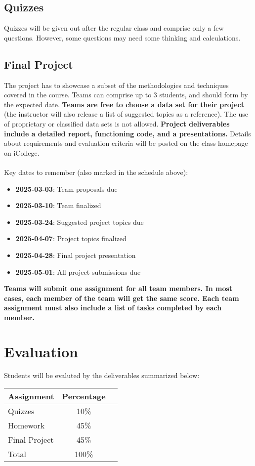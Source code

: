 \documentclass[a4paper, 12pt]{article}
\begin{document}
\subsection{Quizzes}
Quizzes will be given out after the regular class and comprise only a few questions. However, some questions may need some thinking and calculations.

\subsection{Final Project}
The project has to showcase a subset of the methodologies and techniques covered in the course. Teams can comprise up to 3 students, and should form by the expected date. \textbf{Teams are free to choose a data set for their project} (the instructor will also release a list of suggested topics as a reference). The use of proprietary or classiﬁed data sets is not allowed. \textbf{Project deliverables include a detailed report, functioning code, and a presentations.} Details about requirements and evaluation criteria will be posted on the class homepage on iCollege.\\
\\
Key dates to remember (also marked in the schedule above):\\
\begin{itemize}
  \item \textbf{2025-03-03}: Team proposals due
  \item \textbf{2025-03-10}: Team finalized
  \item \textbf{2025-03-24}: Suggested project topics due
  \item \textbf{2025-04-07}: Project topics finalized
  \item \textbf{2025-04-28}: Final project presentation
  \item \textbf{2025-05-01}: All project submissions due
\end{itemize}

\begin{flushleft}
	\textbf{Teams will submit one assignment for all team members. In most cases, each member of the team will get the same score. Each team assignment must also include a list of tasks completed by each member.}
\end{flushleft}

\section{Evaluation}
Students will be evaluted by the deliverables summarized below:\\
\begin{center}
	\begin{tabular}{lcr}
		\hline
		Assignment & Percentage \\
		\hline
		Quizzes & 10\%\\
		Homework & 45\%\\
		Final Project & 45\%\\
		\hline
		Total & 100\%\\   
		\hline     
	\end{tabular}
\end{center}
\end{document}
